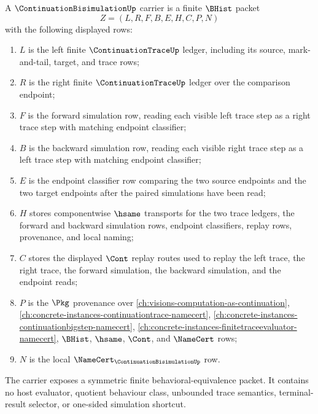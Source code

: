 \begin{definition}
\label{def:continuation-bisimulation-carrier}
A $\ContinuationBisimulationUp$ carrier is a finite $\BHist$ packet
$$
Z=(L,R,F,B,E,H,C,P,N)
$$
with the following displayed rows:
\begin{enumerate}
\item $L$ is the left finite $\ContinuationTraceUp$ ledger, including its source, mark-and-tail, target, and trace rows;
\item $R$ is the right finite $\ContinuationTraceUp$ ledger over the comparison endpoint;
\item $F$ is the forward simulation row, reading each visible left trace step as a right trace step with matching endpoint classifier;
\item $B$ is the backward simulation row, reading each visible right trace step as a left trace step with matching endpoint classifier;
\item $E$ is the endpoint classifier row comparing the two source endpoints and the two target endpoints after the paired simulations have been read;
\item $H$ stores componentwise $\hsame$ transports for the two trace ledgers, the forward and backward simulation rows, endpoint classifiers, replay rows, provenance, and local naming;
\item $C$ stores the displayed $\Cont$ replay routes used to replay the left trace, the right trace, the forward simulation, the backward simulation, and the endpoint reads;
\item $P$ is the $\Pkg$ provenance over \autoref{ch:visions-computation-as-continuation}, \autoref{ch:concrete-instances-continuationtrace-namecert}, \autoref{ch:concrete-instances-continuationbigstep-namecert}, \autoref{ch:concrete-instances-finitetraceevaluator-namecert}, $\BHist$, $\hsame$, $\Cont$, and $\NameCert$ rows;
\item $N$ is the local $\NameCert_{\ContinuationBisimulationUp}$ row.
\end{enumerate}
The carrier exposes a symmetric finite behavioral-equivalence packet. It contains no host evaluator, quotient behaviour class, unbounded trace semantics, terminal-result selector, or one-sided simulation shortcut.
\end{definition}


